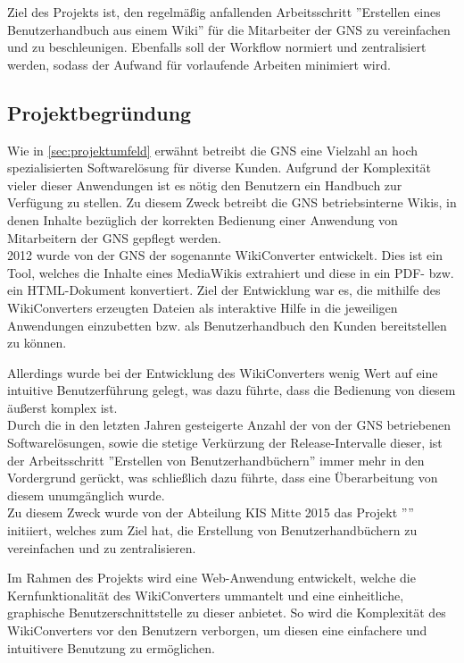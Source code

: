 \documentclass[12pt, xcolor=dvipsnames]{scrartcl}
\begin{document}
Ziel des Projekts ist, den regelmäßig anfallenden Arbeitsschritt ''Erstellen eines Benutzerhandbuch aus einem Wiki'' für die Mitarbeiter der GNS zu vereinfachen und zu beschleunigen. Ebenfalls soll der Workflow normiert und zentralisiert werden, sodass der Aufwand für vorlaufende Arbeiten minimiert wird.

\subsection{Projektbegründung}
\label{sec:projektbegründung}

Wie in \ref{sec:projektumfeld} erwähnt betreibt die GNS eine Vielzahl an hoch spezialisierten Softwarelösung für diverse Kunden. Aufgrund der Komplexität vieler dieser Anwendungen ist es nötig den Benutzern ein Handbuch zur Verfügung zu stellen.
Zu diesem Zweck betreibt die GNS betriebsinterne Wikis, in denen Inhalte bezüglich der korrekten Bedienung einer Anwendung von Mitarbeitern der GNS gepflegt werden. \\

2012 wurde von der GNS der sogenannte WikiConverter entwickelt. Dies ist ein Tool, welches die Inhalte eines MediaWikis extrahiert und diese in ein PDF- bzw. ein HTML-Dokument konvertiert.
Ziel der Entwicklung war es, die mithilfe des WikiConverters erzeugten Dateien als interaktive Hilfe in die jeweiligen Anwendungen einzubetten bzw. als Benutzerhandbuch den Kunden bereitstellen zu können.

Allerdings wurde bei der Entwicklung des WikiConverters wenig Wert auf eine intuitive Benutzerführung gelegt, was dazu führte, dass die Bedienung von diesem äußerst komplex ist. \\

Durch die in den letzten Jahren gesteigerte Anzahl der von der GNS betriebenen Softwarelösungen, sowie die stetige Verkürzung der Release-Intervalle dieser, ist der Arbeitsschritt ''Erstellen von Benutzerhandbüchern'' immer mehr in den Vordergrund gerückt, was schließlich dazu führte, dass eine Überarbeitung von diesem unumgänglich wurde. \\

Zu diesem Zweck wurde von der Abteilung KIS Mitte 2015 das Projekt ''\Projekt'' initiiert, welches zum Ziel hat, die Erstellung von Benutzerhandbüchern zu vereinfachen und zu zentralisieren.

Im Rahmen des Projekts wird eine Web-Anwendung entwickelt, welche die Kernfunktionalität des WikiConverters ummantelt und eine einheitliche, graphische Benutzerschnittstelle zu dieser anbietet. So wird die Komplexität des WikiConverters vor den Benutzern verborgen, um diesen eine einfachere und intuitivere Benutzung zu ermöglichen. \\
\end{document}

